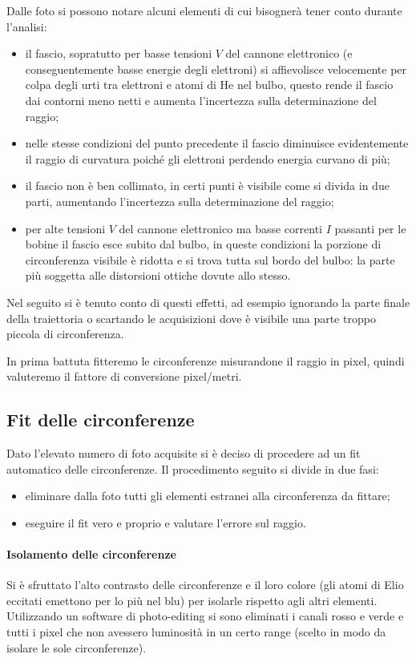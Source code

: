 Dalle foto si possono notare alcuni elementi di cui bisognerà tener conto durante l'analisi:
\begin{itemize}
	\item il fascio, sopratutto per basse tensioni $V$ del cannone elettronico (e conseguentemente basse energie degli elettroni) si affievolisce velocemente per colpa degli urti tra elettroni e atomi di He nel bulbo, questo rende il fascio dai contorni meno netti e aumenta l'incertezza sulla determinazione del raggio;
	\item nelle stesse condizioni del punto precedente il fascio diminuisce evidentemente il raggio di curvatura poiché gli elettroni perdendo energia curvano di più;
	\item il fascio non è ben collimato, in certi punti è visibile come si divida in due parti, aumentando l'incertezza sulla determinazione del raggio;
	\item per alte tensioni $V$ del cannone elettronico ma basse correnti $I$ passanti per le bobine il fascio esce subito dal bulbo, in queste condizioni la porzione di circonferenza visibile è ridotta e si trova tutta sul bordo del bulbo: la parte più soggetta alle distorsioni ottiche dovute allo stesso.
\end{itemize}

Nel seguito si è tenuto conto di questi effetti, ad esempio ignorando la parte finale della traiettoria o scartando le acquisizioni dove è visibile una parte troppo piccola di circonferenza.

In prima battuta fitteremo le circonferenze misurandone il raggio in pixel, quindi valuteremo il fattore di conversione pixel/metri.

\subsection{Fit delle circonferenze} 
Dato l'elevato numero di foto acquisite si è deciso di procedere ad un fit automatico delle circonferenze. Il procedimento seguito si divide in due fasi:
\begin{itemize}
	\item eliminare dalla foto tutti gli elementi estranei alla circonferenza da fittare;
	\item eseguire il fit vero e proprio e valutare l'errore sul raggio.
\end{itemize}

\paragraph{Isolamento delle circonferenze} Si è sfruttato l'alto contrasto delle circonferenze e il loro colore (gli atomi di Elio eccitati emettono per lo più nel blu) per isolarle rispetto agli altri elementi. Utilizzando un software di photo-editing si sono eliminati i canali rosso e verde e tutti i pixel che non avessero luminosità in un certo range (scelto in modo da isolare le sole circonferenze). 

